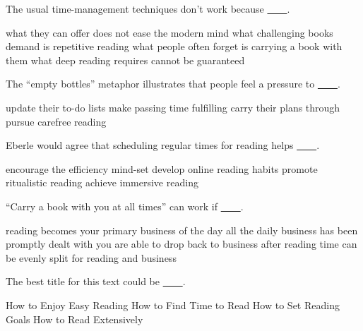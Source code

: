 \item The usual time-management techniques don't work because \uline{~~~~}.
\begin{tasks}
	\task what they can offer does not ease the modern mind
	\task what challenging books demand is repetitive reading
	\task what people often forget is carrying a book with them
	\task what deep reading requires cannot be guaranteed
\end{tasks}
\item The ``empty bottles'' metaphor illustrates that people feel a pressure to \uline{~~~~}.
\begin{tasks}
	\task update their to-do lists
	\task make passing time fulfilling
	\task carry their plans through
	\task pursue carefree reading
\end{tasks}
\item Eberle would agree that scheduling regular times for reading helps \uline{~~~~}.
\begin{tasks}
	\task encourage the efficiency mind-set
	\task develop online reading habits
	\task promote ritualistic reading
	\task achieve immersive reading
\end{tasks}
\item ``Carry a book with you at all times'' can work if \uline{~~~~}.
\begin{tasks}
	\task reading becomes your primary business of the day
	\task all the daily business has been promptly dealt with
	\task you are able to drop back to business after reading
	\task time can be evenly split for reading and business
\end{tasks}
\item The best title for this text could be \uline{~~~~}.
\begin{tasks}
	\task How to Enjoy Easy Reading
	\task How to Find Time to Read
	\task How to Set Reading Goals
	\task How to Read Extensively
\end{tasks}